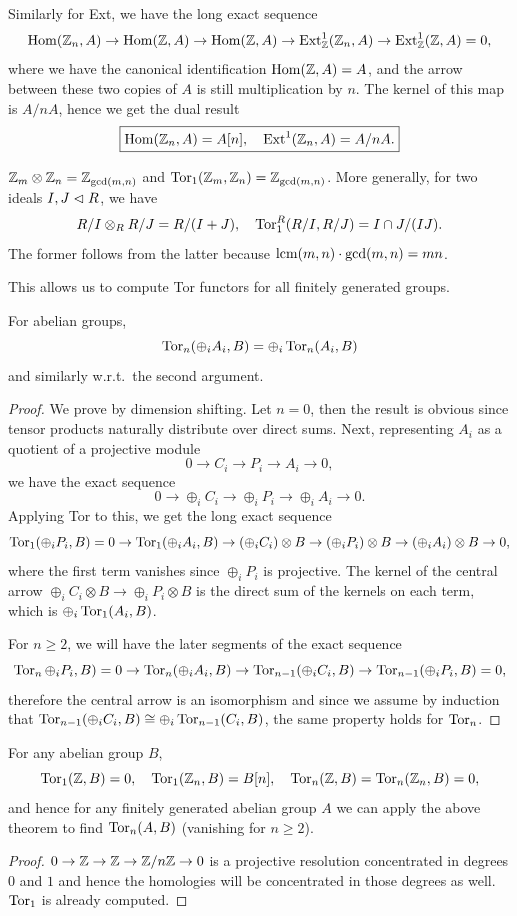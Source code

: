 Similarly for Ext, we have the long exact sequence
\[\operatorname{Hom}(\mathbb{Z}_n,A)\to \operatorname{Hom}(\mathbb{Z},A)\to \operatorname{Hom}(\mathbb{Z},A)\to \operatorname{Ext}^1_{\mathbb{Z}}(\mathbb{Z}_n,A)\to \operatorname{Ext}^1_{\mathbb{Z}}(\mathbb{Z},A)=0,\]
where we have the canonical identification $\operatorname{Hom}(\mathbb{Z},A)=A$, and the arrow between these two copies of $A$ is still multiplication by $n$. The kernel of this map is $A\slash nA$, hence we get the dual result
\[\boxed{\operatorname{Hom}(\mathbb{Z}_n,A)=A[n],\quad \operatorname{Ext}^1(\mathbb{Z}_n,A)=A\slash nA.}\]
    
\begin{cor}
    $\mathbb{Z}_m\otimes \mathbb{Z}_n=\mathbb{Z}_{\gcd(m,n)}$ and $\operatorname{Tor}_1(\mathbb{Z}_m,\mathbb{Z}_n)=\mathbb{Z}_{\gcd(m,n)}$. More generally, for two ideals $I,J\vartriangleleft R$, we have
    \[R\slash I\otimes_R R\slash J=R\slash(I+J),\quad \operatorname{Tor}_1^R(R\slash I,R\slash J)=I\cap J\slash (IJ).\]
    The former follows from the latter because $\operatorname{lcm}(m,n)\cdot\gcd(m,n)=mn$.
\end{cor}

This allows us to compute Tor functors for all finitely generated groups.

\begin{thm}
    For abelian groups,
    \[\operatorname{Tor}_n(\oplus_i A_i,B)=\oplus_i \operatorname{Tor}_n(A_i,B)\]
    and similarly w.r.t.\ the second argument.
\end{thm}
\begin{proof}
    We prove by dimension shifting. Let $n=0$, then the result is obvious since tensor products naturally distribute over direct sums.
     Next, representing $A_i$ as a quotient of a projective module
     \[0\to C_i\to P_i\to A_i\to 0,\]
     we have the exact sequence
     \[0\to \oplus_i C_i\to \oplus_i P_i\to \oplus_i A_i\to 0.\]
     Applying Tor to this, we get the long exact sequence
     \[\operatorname{Tor}_1(\oplus_i P_i,B)=0\to\operatorname{Tor}_1(\oplus_i A_i,B)\to (\oplus_i C_i)\otimes B\to (\oplus_i P_i)\otimes B\to (\oplus_i A_i)\otimes B\to 0,\]
     where the first term vanishes since $\oplus_i P_i$ is projective. The kernel of the central arrow $\oplus_i C_i\otimes B\to \oplus_i P_i\otimes B$ is the direct sum of the kernels on each term, which is $\oplus_i\operatorname{Tor}_1(A_i,B)$.

     For $n\geq 2$, we will have the later segments of the exact sequence
     \[\operatorname{Tor}_n\oplus_i P_i,B)=0\to \operatorname{Tor}_n(\oplus_iA_i,B)\to \operatorname{Tor}_{n-1}(\oplus_iC_i,B)\to \operatorname{Tor}_{n-1}(\oplus_i P_i,B)=0,\]
     therefore the central arrow is an isomorphism and since we assume by induction that $\operatorname{Tor}_{n-1}(\oplus_iC_i,B)\cong\oplus_i\operatorname{Tor}_{n-1}(C_i,B)$, the same property holds for $\operatorname{Tor}_n$.
\end{proof}
\begin{cor}
    For any abelian group $B$,
    \[\operatorname{Tor}_1(\mathbb{Z},B)=0,\quad \operatorname{Tor}_1(\mathbb{Z}_n,B)=B[n],\quad \operatorname{Tor}_n(\mathbb{Z},B)=\operatorname{Tor}_n(\mathbb{Z}_n,B)=0,\]
    and hence for any finitely generated abelian group $A$ we can apply the above theorem to find $\operatorname{Tor}_n(A,B)$ (vanishing for $n\geq 2$).
\end{cor}
\begin{proof}
    $0\to \mathbb{Z}\to \mathbb{Z}\to \mathbb{Z}\slash n\mathbb{Z} \to 0$ is a projective resolution concentrated in degrees $0$ and $1$ and hence the homologies will be concentrated in those degrees as well. $\operatorname{Tor}_1$ is already computed.
\end{proof}

